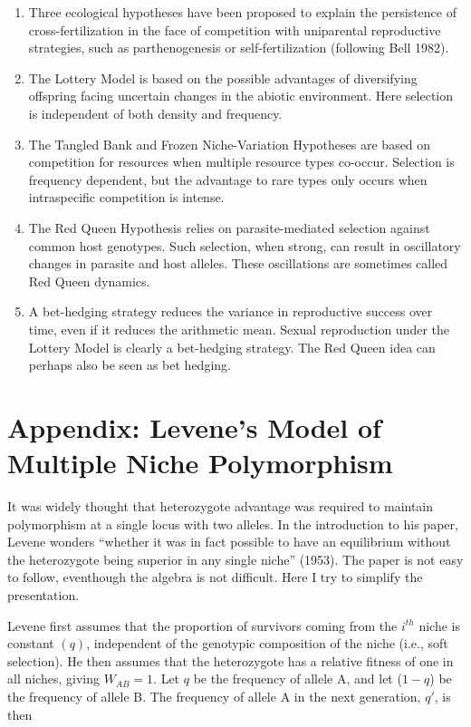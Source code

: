 \documentclass[
  letterpaper,
]{book}
\begin{document}
\begin{enumerate}
\def\labelenumi{\arabic{enumi}.}
\item
  Three ecological hypotheses have been proposed to explain the
  persistence of cross-fertilization in the face of competition with
  uniparental reproductive strategies, such as parthenogenesis or
  self-fertilization (following Bell 1982).
\item
  The Lottery Model is based on the possible advantages of diversifying
  offspring facing uncertain changes in the abiotic environment. Here
  selection is independent of both density and frequency.
\item
  The Tangled Bank and Frozen Niche-Variation Hypotheses are based on
  competition for resources when multiple resource types co-occur.
  Selection is frequency dependent, but the advantage to rare types only
  occurs when intraspecific competition is intense.
\item
  The Red Queen Hypothesis relies on parasite-mediated selection against
  common host genotypes. Such selection, when strong, can result in
  oscillatory changes in parasite and host alleles. These oscillations
  are sometimes called Red Queen dynamics.
\item
  A bet-hedging strategy reduces the variance in reproductive success
  over time, even if it reduces the arithmetic mean. Sexual reproduction
  under the Lottery Model is clearly a bet-hedging strategy. The Red
  Queen idea can perhaps also be seen as bet hedging.
\end{enumerate}

\section{Appendix: Levene's Model of Multiple Niche
Polymorphism}\label{sec-app-2}

It was widely thought that heterozygote advantage was required to
maintain polymorphism at a single locus with two alleles. In the
introduction to his paper, Levene wonders ``whether it was in fact
possible to have an equilibrium without the heterozygote being superior
in any single niche'' (1953). The paper is not easy to follow,
eventhough the algebra is not difficult. Here I try to simplify the
presentation.

Levene first assumes that the proportion of survivors coming from the
\(i^{th}\) niche is constant \((q)\), independent of the genotypic
composition of the niche (i.e., soft selection). He then assumes that
the heterozygote has a relative fitness of one in all niches, giving
\(W_{AB} = 1\). Let \(q\) be the frequency of allele A, and let
(\(1 - q\)) be the frequency of allele B. The frequency of allele A in
the next generation, \(q'\), is then
\end{document}
